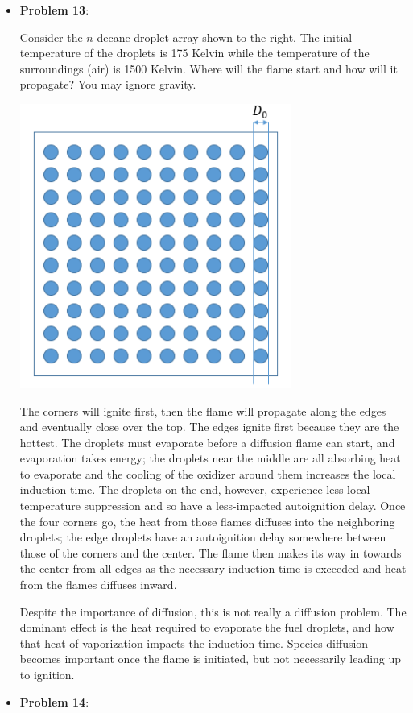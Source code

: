 \documentclass[11pt]{article}
\newcommand{\Item}[1]{\item \textbf{#1}:}
\newcommand{\Problem}[1]{\Item{Problem #1}}
\begin{document}
\begin{itemize}
\Problem{13}\\
\begin{minipage}{0.58\textwidth}
Consider the $n$-decane droplet array shown to the right. The initial temperature of the droplets is 175 Kelvin while the temperature of the surroundings (air) is 1500 Kelvin. Where will the flame start and how will it propagate? You may ignore gravity.
\end{minipage}
\begin{minipage}{0.38\textwidth}
\centering\includegraphics[width=0.7\textwidth]{Graphics/droplet_array.PNG}
\end{minipage}

\vspace{0.75cm}
The corners will ignite first, then the flame will propagate along the edges and eventually close over the top. The edges ignite first because they are the hottest. The droplets must evaporate before a diffusion flame can start, and evaporation takes energy; the droplets near the middle are all absorbing heat to evaporate and the cooling of the oxidizer around them increases the local induction time. The droplets on the end, however, experience less local temperature suppression and so have a less-impacted autoignition delay. Once the four corners go, the heat from those flames diffuses into the neighboring droplets; the edge droplets have an autoignition delay somewhere between those of the corners and the center. The flame then makes its way in towards the center from all edges as the necessary induction time is exceeded and heat from the flames diffuses inward.

Despite the importance of diffusion, this is not really a diffusion problem. The dominant effect is the heat required to evaporate the fuel droplets, and how that heat of vaporization impacts the induction time. Species diffusion becomes important once the flame is initiated, but not necessarily leading up to ignition.

\Problem{14}



\end{itemize}
\end{document}
